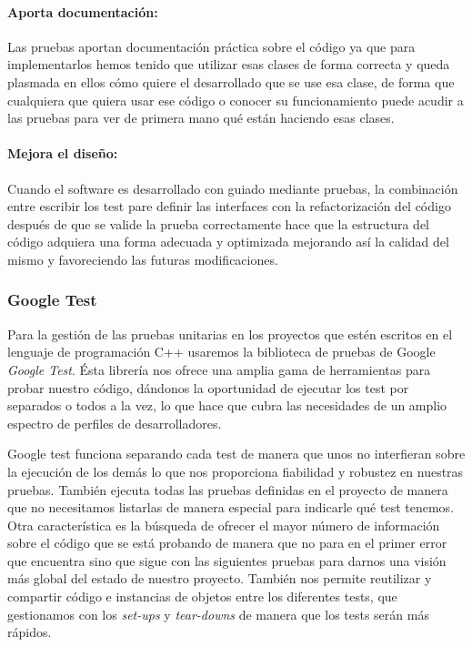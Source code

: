 \documentclass[12pt,a4paper,spanish]{book} %
\begin{document}
 \paragraph{Aporta documentación:} Las pruebas aportan documentación práctica sobre el código ya que para implementarlos hemos tenido que utilizar esas clases de forma correcta y queda plasmada en ellos cómo quiere el desarrollado que se use esa clase, de forma que cualquiera que quiera usar ese código o conocer su funcionamiento puede acudir a las pruebas para ver de primera mano qué están haciendo esas clases.
 \paragraph{Mejora el diseño:} Cuando el software es desarrollado con guiado mediante pruebas, la combinación entre escribir los test pare definir las interfaces con la refactorización del código después de que se valide la prueba correctamente hace que la estructura del código adquiera una forma adecuada y optimizada mejorando así la calidad del mismo y favoreciendo las futuras modificaciones.
 
 \subsubsection{Google Test}
 
 Para la gestión de las pruebas unitarias en los proyectos que estén escritos en el lenguaje de programación C++ usaremos la biblioteca de pruebas de Google \emph{Google Test}. Ésta librería nos ofrece una amplia gama de herramientas para probar nuestro código, dándonos la oportunidad de ejecutar los test por separados o todos a la vez, lo que hace que cubra las necesidades de un amplio espectro de perfiles de desarrolladores.
 
 Google test funciona separando cada test de manera que unos no interfieran sobre la ejecución de los demás lo que nos proporciona fiabilidad y robustez en nuestras pruebas. También ejecuta todas las pruebas definidas en el proyecto de manera que no necesitamos listarlas de manera especial para indicarle qué test tenemos. Otra característica es la búsqueda de ofrecer el mayor número de información sobre el código que se está probando de manera que no para en el primer error que encuentra sino que sigue con las siguientes pruebas para darnos una visión más global del estado de nuestro proyecto. También nos permite reutilizar y compartir código e instancias de objetos entre los diferentes tests, que gestionamos con los \emph{set-ups} y \emph{tear-downs} de manera que los tests serán más rápidos.
 
\end{document}
